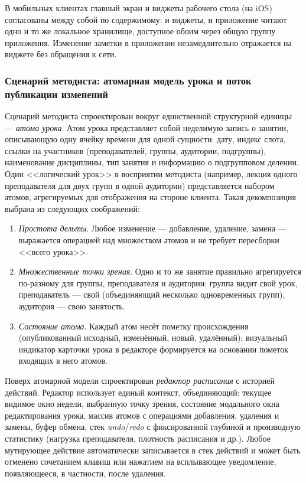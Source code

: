 В мобильных клиентах главный экран и виджеты рабочего стола (на iOS) согласованы между собой по содержимому: и виджеты, и приложение читают одно и то же локальное хранилище, доступное обоим через общую группу приложения. Изменение заметки в приложении незамедлительно отражается на виджете без обращения к сети.

\subsubsection{Сценарий методиста: атомарная модель урока и поток публикации изменений}
\label{subsubsec:methodist-scenario}

Сценарий методиста спроектирован вокруг единственной структурной единицы --- \emph{атома урока}. Атом урока представляет собой неделимую запись о занятии, описывающую одну ячейку времени для одной сущности: дату, индекс слота, ссылки на участников (преподавателей, группы, аудитории, подгруппы), наименование дисциплины, тип занятия и информацию о подгрупповом делении. Один <<логический урок>> в восприятии методиста (например, лекция одного преподавателя для двух групп в одной аудитории) представляется набором атомов, агрегируемых для отображения на стороне клиента. Такая декомпозиция выбрана из следующих соображений:

\begin{enumerate}
  \item \emph{Простота дельты}. Любое изменение --- добавление, удаление, замена --- выражается операцией над множеством атомов и не требует пересборки <<всего урока>>.
  \item \emph{Множественные точки зрения}. Одно и то же занятие правильно агрегируется по-разному для группы, преподавателя и аудитории: группа видит свой урок, преподаватель --- свой (объединяющий несколько одновременных групп), аудитория --- свою занятость.
  \item \emph{Состояние атома}. Каждый атом несёт пометку происхождения (опубликованный исходный, изменённый, новый, удалённый); визуальный индикатор карточки урока в редакторе формируется на основании пометок входящих в него атомов.
\end{enumerate}

Поверх атомарной модели спроектирован \emph{редактор расписания} с историей действий. Редактор использует единый контекст, объединяющий: текущее видимое окно недели, выбранную точку зрения, состояние модального окна редактирования урока, массив атомов с операциями добавления, удаления и замены, буфер обмена, стек \emph{undo}/\emph{redo} с фиксированной глубиной и производную статистику (нагрузка преподавателя, плотность расписания и др.). Любое мутирующее действие автоматически записывается в стек действий и может быть отменено сочетанием клавиш или нажатием на всплывающее уведомление, появляющееся, в частности, после удаления.


